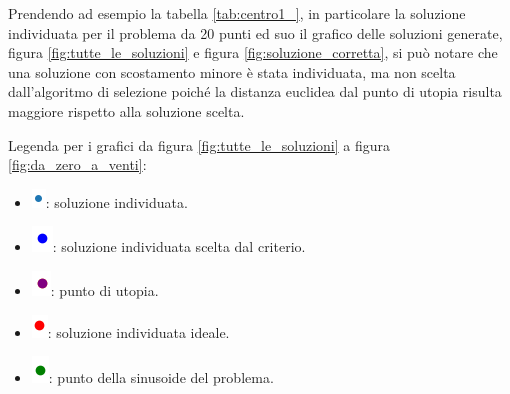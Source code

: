 \documentclass[a4paper,12pt]{report}
\begin{document}
Prendendo ad esempio la tabella \ref{tab:centro1_}, in particolare la soluzione individuata per il problema da 20 punti ed suo il grafico delle soluzioni generate, figura \ref{fig:tutte_le_soluzioni} e figura \ref{fig:soluzione_corretta}, si può notare che una soluzione con scostamento minore è stata individuata, ma non scelta dall'algoritmo di selezione poiché la distanza euclidea dal punto di utopia risulta maggiore rispetto alla soluzione scelta.

Legenda per i grafici da figura \ref{fig:tutte_le_soluzioni} a figura \ref{fig:da_zero_a_venti}:
\begin{itemize}
  \item \includegraphics{img/utility/matplotlib_markers/soluzione.png}: soluzione individuata.
  \item \includegraphics{img/utility/matplotlib_markers/soluzione_scelta.png}: soluzione individuata scelta dal criterio.
  \item \includegraphics{img/utility/matplotlib_markers/punto_utopia.png}:
  punto di utopia.
  \item \includegraphics{img/utility/matplotlib_markers/soluzione_ideale.png}: soluzione individuata ideale.
  \item \includegraphics{img/utility/matplotlib_markers/punto_sinusoide.png}: punto della sinusoide del problema.
\end{itemize}
\end{document}
